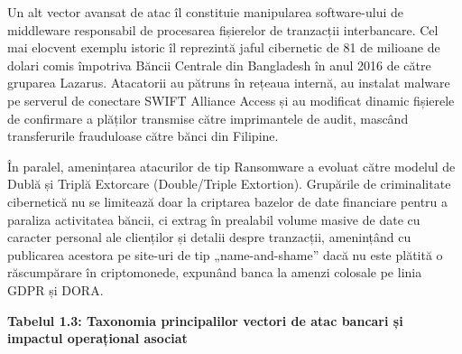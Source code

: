 \documentclass[
]{article}
\begin{document}
Un alt vector avansat de atac îl constituie manipularea software-ului de
middleware responsabil de procesarea fișierelor de tranzacții
interbancare. Cel mai elocvent exemplu istoric îl reprezintă jaful
cibernetic de 81 de milioane de dolari comis împotriva Băncii Centrale
din Bangladesh în anul 2016 de către gruparea Lazarus. Atacatorii au
pătruns în rețeaua internă, au instalat malware pe serverul de conectare
SWIFT Alliance Access și au modificat dinamic fișierele de confirmare a
plăților transmise către imprimantele de audit, mascând transferurile
frauduloase către bănci din Filipine.

În paralel, amenințarea atacurilor de tip Ransomware a evoluat către
modelul de Dublă și Triplă Extorcare (Double/Triple Extortion).
Grupările de criminalitate cibernetică nu se limitează doar la criptarea
bazelor de date financiare pentru a paraliza activitatea băncii, ci
extrag în prealabil volume masive de date cu caracter personal ale
clienților și detalii despre tranzacții, amenințând cu publicarea
acestora pe site-uri de tip „name-and-shame'' dacă nu este plătită o
răscumpărare în criptomonede, expunând banca la amenzi colosale pe linia
GDPR și DORA.

\textbf{Tabelul 1.3: Taxonomia principalilor vectori de atac bancari și
impactul operațional asociat}
\end{document}
